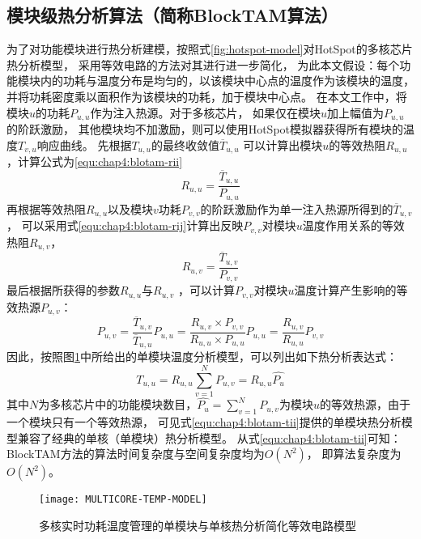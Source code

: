 \subsection{模块级热分析算法（简称BlockTAM算法）}
为了对功能模块进行热分析建模，按照式\ref{fig:hotspot-model}对HotSpot的多核芯片热分析模型， 采用等效电路的方法对其进行进一步简化， 为此本文假设：每个功能模块内的功耗与温度分布是均匀的，以该模块中心点的温度作为该模块的温度， 并将功耗密度乘以面积作为该模块的功耗，加于模块中心点。
在本文工作中，将模块$u$的功耗$P_{u,u}$作为注入热源。对于多核芯片， 如果仅在模块$u$加上幅值为$P_{u,u}$的阶跃激励， 其他模块均不加激励，则可以使用HotSpot模拟器获得所有模块的温度$T_{v,u}$响应曲线。 先根据$T_{u,u}$的最终收敛值$\overline{T}_{u,u}$ 可以计算出模块$u$的等效热阻$R_{u,u}$，计算公式为\ref{equ:chap4:blotam-rii}
\begin{equation}
\label{equ:chap4:blotam-rii}
R_{u,u} = \frac{\overline{T}_{u,u}}{P_{u,u}}
\end{equation}
再根据等效热阻$R_{u,u}$以及模块$v$功耗$P_{v,v}$的阶跃激励作为单一注入热源所得到的$\overline{T}_{u,v}$， 可以采用式\ref{equ:chap4:blotam-rij}计算出反映$P_{v,v}$对模块$u$温度作用关系的等效热阻$R_{u,v}$，
\begin{equation}
\label{equ:chap4:blotam-rij}
R_{u,v} = \frac{\overline{T}_{u,v}}{P_{v,v}}
\end{equation}
最后根据所获得的参数$R_{u,u}$与$R_{u,v}$ ，可以计算$P_{v,v}$对模块$u$温度计算产生影响的等效热源$P_{u,v}$：
\begin{equation}
\label{equ:chap4:blotam-pij}
P_{u,v} = \frac{\overline{T}_{u,v}}{\overline{T}_{u,u}}P_{u,u} = \frac{R_{u,v}\times P_{v,v}}{R_{u,u}\times P_{u,u}}P_{u,u}=\frac{R_{u,v}}{R_{u,u}}P_{v,v}
\end{equation}
因此，按照图\ref{fig:multicore-temp-model}中所给出的单模块温度分析模型，可以列出如下热分析表达式：
\begin{equation}
\label{equ:chap4:blotam-tii}
T_{u,u} = R_{u,u}\sum\limits_{v=1}^N P_{u,v} = R_{u,u}\widehat{P_{u}}
\end{equation}
其中$N$为多核芯片中的功能模块数目，$\widehat{P_{u}} = \sum\limits_{v=1}^N P_{u,v}$为模块$u$的等效热源，由于一个模块只有一个等效热源， 可见式\ref{equ:chap4:blotam-tii}提供的单模块热分析模型兼容了经典的单核（单模块）热分析模型。 从式\ref{equ:chap4:blotam-tii}可知：BlockTAM方法的算法时间复杂度与空间复杂度均为$O(N^2)$， 即算法复杂度为$O(N^2)$。
\begin{figure}[H]
  \centering
  \texttt{[image: MULTICORE-TEMP-MODEL]}
  \caption{多核实时功耗温度管理的单模块与单核热分析简化等效电路模型}
  \label{fig:multicore-temp-model}
\end{figure}

